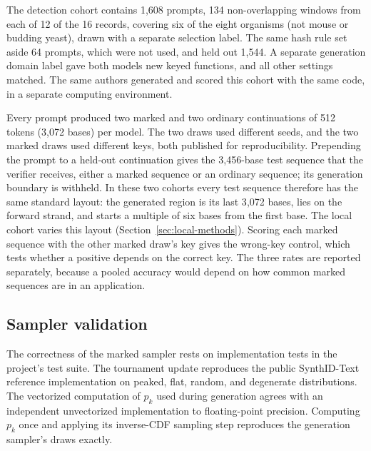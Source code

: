\documentclass[10pt,twocolumn]{article}
\begin{document}
The detection cohort contains 1{,}608 prompts, 134 non-overlapping windows from each of 12 of the
16 records, covering six of the eight organisms (not mouse or budding yeast), drawn with a separate
selection label. The same hash rule set aside 64 prompts, which were not used, and held out
1{,}544. A separate generation domain label gave both models new keyed functions, and all other
settings matched. The same authors generated and scored this cohort with the same code, in a
separate computing environment.

Every prompt produced two marked and two ordinary continuations of 512 tokens (3{,}072 bases) per
model. The two draws used different seeds, and the two marked draws used different keys, both
published for reproducibility. Prepending the prompt to a held-out continuation gives the
3{,}456-base test sequence that the verifier receives, either a marked sequence or an ordinary
sequence; its generation boundary is withheld. In these two cohorts every test sequence therefore
has the same standard layout: the generated region is its last 3{,}072 bases, lies on the forward
strand, and starts a multiple of six bases from the first base. The local cohort varies this layout
(Section~\ref{sec:local-methods}). Scoring each marked sequence with the other marked draw's key gives the wrong-key control,
which tests whether a positive depends on the correct key. The three rates are reported
separately, because a pooled accuracy would depend on how common marked sequences are in an
application.

\subsection{Sampler validation}
\label{sec:sampler-validation}

The correctness of the marked sampler rests on implementation tests in the project's test suite.
The tournament update reproduces the public SynthID-Text reference implementation
\cite{synthidtextcode} on peaked, flat, random, and degenerate distributions. The vectorized
computation of $p_k$ used during generation agrees with an independent unvectorized implementation
to floating-point precision. Computing $p_k$ once and applying its inverse-CDF sampling step
reproduces the generation sampler's draws exactly.
\end{document}
